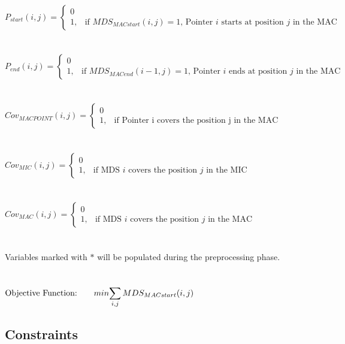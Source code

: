 $P_{start}(i,j) = \begin{cases} 0 \\ 1, & \mbox{if } MDS_{MACstart}(i,j) = 1 \mbox{, Pointer } i \mbox{ starts at position } j \mbox{ in the MAC} \end{cases}$ \\\\\\
$P_{end}(i,j) = \begin{cases} 0 \\ 1, & \mbox{if } MDS_{MACend}(i-1,j) = 1 \mbox{, Pointer } i \mbox{ ends at position } j \mbox{ in the MAC} \end{cases}$ \\\\\\
$Cov_{MACPOINT}(i,j) = \begin{cases} 0 \\ 1, & \mbox{if Pointer i covers the position j in the MAC} \end{cases}$ \\\\\\
$Cov_{MIC}(i,j) = \begin{cases} 0 \\ 1, & \mbox{if MDS } i\mbox{ covers the position } j \mbox{ in the MIC} \end{cases}$ \\\\\\
$Cov_{MAC}(i,j) = \begin{cases} 0 \\ 1, & \mbox{if MDS } i\mbox{ covers the position } j \mbox{ in the MAC} \end{cases}$ \\\\\\
Variables marked with $*$ will be populated during the preprocessing phase. \\\\\\

$\mbox{Objective Function:} \qquad min \mathlarger{\sum_{i,j} MDS_{MACstart}(i,j)}$
\clearpage
\subsection{Constraints}

